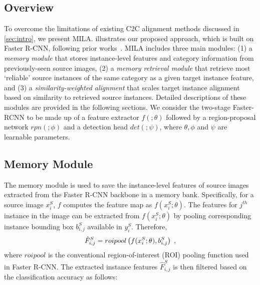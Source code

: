 \documentclass{bmvc2k}
\begin{document}
\subsection{Overview}\label{sec:overview}



To overcome the limitations of existing C2C alignment methods discussed in \cref{sec:intro}, we present MILA.  illustrates our proposed approach, which is built on Faster R-CNN, following prior works~\cite{saito2019strong, xu2020cross, li2022cross}. MILA includes three main modules: (1) a \textit{memory module} that stores instance-level features and category information from previously-seen source images, (2) a \textit{memory retrieval module} that retrieve most `reliable' source instances of the same category as a given target instance feature,
and (3) a \textit{similarity-weighted alignment} that scales target instance alignment based on similarity to retrieved source instances. Detailed descriptions of these modules are provided in the following sections.
We consider the two-stage Faster-RCNN to be made up of a feature extractor $f( ; \theta)$ followed by a region-proposal network $rpn(; \phi)$ and a detection head $det(;\psi)$, where $\theta, \phi$ and $\psi$ are learnable parameters. 


\subsection{Memory Module}\label{sec:memory module}
The memory module is used to save the instance-level features of source images extracted from the Faster R-CNN backbone in a memory bank. Specifically, for a source image $x^S_i$, $f$ computes the feature map as $f(x^S_i; \theta)$. 
The features for $j^{th}$ instance in the image can be extracted from $f(x^S_i; \theta)$ by pooling corresponding instance bounding box $b^S_{i,j}$ available in $y^S_i$. Therefore,
\begin{equation}
    \hat{F}^S_{i,j}= roipool\left(f(x^S_i; \theta), b^S_{i,j}\right) \hspace{1mm},
\end{equation}
where $roipool$ is the conventional region-of-interest (ROI) pooling function used in Faster R-CNN. The extracted instance features $\hat{F}^S_{i,j}$ is then filtered based on the classification accuracy as follows:
\end{document}
